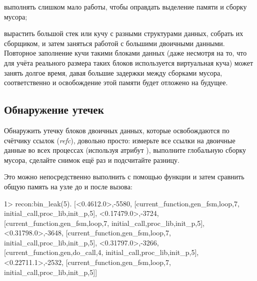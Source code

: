 \begin{enumerate*}
	\item выполнять слишком мало работы, чтобы оправдать выделение памяти и сборку мусора; 
	\item вырастить большой стек или кучу с разными структурами данных, собрать их сборщиком, и затем заняться работой с большими двоичными данными. Повторное заполнение кучи такими блоками данных (даже несмотря на то, что для учёта реального размера таких блоков используется виртуальная куча) может занять долгое время, давая большие задержки между сборками мусора, соответственно и освобождение этой памяти будет отложено на будущее.
\end{enumerate*}

\subsection{Обнаружение утечек}

Обнаружить утечку блоков двоичных данных, которые освобождаются по счётчику ссылок (\emph{refc}), довольно просто: измерьте все ссылки на двоичные данные во всех процессах (используя атрибут ), выполните глобальную сборку мусора, сделайте снимок ещё раз и подсчитайте разницу.

Это можно непосредственно выполнить с помощью функции  и затем сравнить общую память на узле до и после вызова:

\begin{VerbatimEshell}
1> recon:bin_leak(5).
[{<0.4612.0>,-5580,
  [{current_function,{gen_fsm,loop,7}},
   {initial_call,{proc_lib,init_p,5}}]},
 {<0.17479.0>,-3724,
  [{current_function,{gen_fsm,loop,7}},
   {initial_call,{proc_lib,init_p,5}}]},
 {<0.31798.0>,-3648,
  [{current_function,{gen_fsm,loop,7}},
   {initial_call,{proc_lib,init_p,5}}]},
 {<0.31797.0>,-3266,
  [{current_function,{gen,do_call,4}},
   {initial_call,{proc_lib,init_p,5}}]},
 {<0.22711.1>,-2532,
  [{current_function,{gen_fsm,loop,7}},
   {initial_call,{proc_lib,init_p,5}}]}]
\end{VerbatimEshell}

